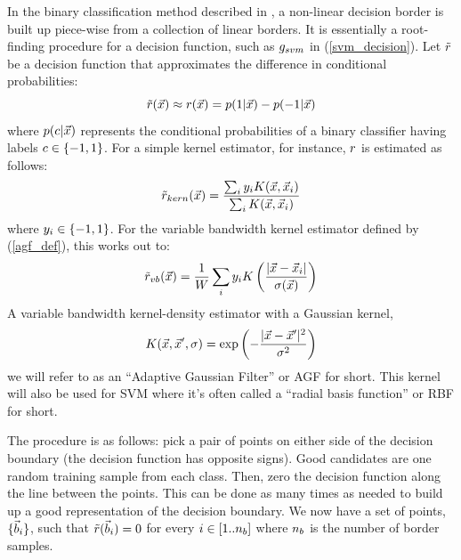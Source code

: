 In the binary classification method described in \citet{Mills2011},
a non-linear decision border is built up piece-wise from a collection of linear borders.
It is essentially a root-finding procedure for a decision function,
such as $g_{svm}$ in (\ref{svm_decision}).
Let $\tilde r$ be a decision function
that approximates the difference in conditional probabilities:
\begin{equation}
	\tilde r(\vec {x}) \approx r(\vec {x}) = 
	p(1|\vec {x}) - p(-1|\vec {x})
	\label{rdef}
\end{equation}
where $p(c|\vec {x})$ represents the conditional probabilities of
a binary classifier having labels $c \in \lbrace -1, 1 \rbrace$.
For a simple kernel estimator, for instance, 
$r$ is estimated as follows:
\begin{equation}
	\tilde r_{kern}(\vec {x}) = \frac{\sum_i y_i K(\vec {x}, \vec {x}_i)}{\sum_i K(\vec {x}, \vec {x}_i)}
	\label{kernel_decision}
\end{equation}
where $y_i \in \lbrace -1, 1 \rbrace$.
For the variable bandwidth kernel estimator defined by (\ref{agf_def}), this works out to:
\begin{equation}
	\tilde r_{vb}(\vec {x}) = \frac{1}{W} \sum_i y_i K \left (\frac{|\vec {x} - \vec {x}_i|}{\sigma(\vec {x})} \right )
	\label{vb_kernel_r}
\end{equation}
A variable bandwidth kernel-density estimator with a Gaussian kernel,
\begin{equation}
	K(\vec {x}, \vec {x}^\prime, \sigma) = \exp \left ( - \frac{|\vec {x} - \vec {x}^\prime|^2}{\sigma^2} \right )
	\label{Gaussian_kernel}
\end{equation}
we will refer to as an ``Adaptive Gaussian Filter'' or AGF for short.
This kernel will also be used for SVM where it's often called a ``radial
basis function'' or RBF for short.

The procedure is as follows: pick a pair of points on either side of the decision
boundary (the decision function has opposite signs). Good candidates are one
random training sample from each class. Then, zero the decision function
along the line between the points. This can be done as many times as needed
to build up a good representation of the decision boundary.
We now have a set of points, $\lbrace \vec b_i \rbrace$, such that
$\tilde r(\vec b_i)=0$ for every $i \in [1..n_b]$ where
$n_b$ is the number of border samples.

